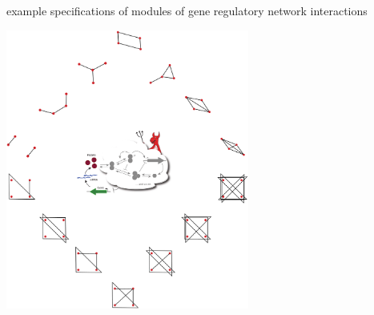 \begin{frame}
example specifications of modules of gene regulatory network interactions
\begin{center}
\includegraphics[width=0.6\textwidth]{fig/fourgraphsdemon.pdf}
\end{center}
\end{frame}
